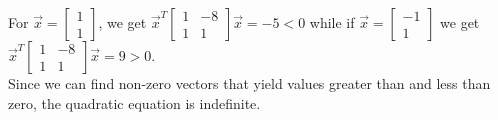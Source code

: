 \documentclass[12pt]{extarticle}
\theoremstyle{definition}
\begin{document}
\begin{problem}
		For $\vec{x} = \begin{bmatrix} 1 \\ 1 \end{bmatrix}$, we get $\vec{x}^T \begin{bmatrix}1 & -8\\ 1 & 1 \end{bmatrix}\vec{x} = -5 < 0$ 
		while if $\vec{x} = \begin{bmatrix} -1 \\ 1 \end{bmatrix}$ we get $\vec{x}^T \begin{bmatrix}1 & -8\\ 1 & 1 \end{bmatrix}\vec{x} = 9 > 0$.\\

		Since we can find non-zero vectors that yield values greater than and less than zero, the quadratic equation is indefinite.

\end{problem}


\small


\end{document}
